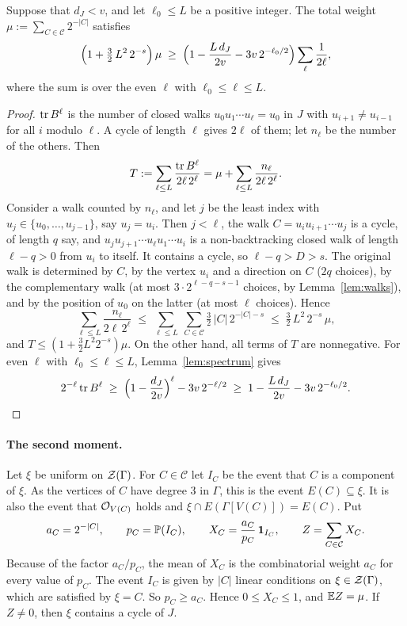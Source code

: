 \begin{lemma}\label{lem:weight}
Suppose that $d_J<v$, and let $\ell_0\le L$ be a positive integer. The total weight
$\mu:=\sum_{C\in\mathcal{C}}2^{-|C|}$ satisfies
\[
  \Bigl(1+\tfrac32\,L^{2}\,2^{-s}\Bigr)\,\mu\;\ge\;
  \Bigl(1-\frac{L\,d_J}{2v}-3v\,2^{-\ell_0/2}\Bigr)\sum_{\ell}\frac1{2\ell},
\]
where the sum is over the even $\ell$ with $\ell_0\le\ell\le L$.
\end{lemma}

\begin{proof}
$\operatorname{tr} B^{\ell}$ is the number of closed walks $u_0u_1\cdots u_\ell=u_0$ in $J$ with
$u_{i+1}\ne u_{i-1}$ for all $i$ modulo $\ell$. A cycle of length $\ell$ gives $2\ell$ of them; let
$n_\ell$ be the number of the others. Then
\[
  T:=\sum_{\ell\le L}\frac{\operatorname{tr} B^{\ell}}{2\ell\,2^{\ell}}=\mu+\sum_{\ell\le L}\frac{n_\ell}{2\ell\,2^{\ell}} .
\]
Consider a walk counted by $n_\ell$, and let $j$ be the least index with
$u_j\in\{u_0,\dots,u_{j-1}\}$, say $u_j=u_i$. Then $j<\ell$, the walk $C=u_iu_{i+1}\cdots u_j$ is a
cycle, of length $q$ say, and $u_ju_{j+1}\cdots u_\ell u_1\cdots u_i$ is a non-backtracking closed
walk of length $\ell-q>0$ from $u_i$ to itself. It contains a cycle, so $\ell-q>D>s$. The original
walk is determined by $C$, by the vertex $u_i$ and a direction on $C$ ($2q$ choices), by the
complementary walk (at most $3\cdot2^{\ell-q-s-1}$ choices, by Lemma~\ref{lem:walks}), and by the
position of $u_0$ on the latter (at most $\ell$ choices). Hence
\[
  \sum_{\ell\le L}\frac{n_\ell}{2\ell\,2^{\ell}}
  \;\le\;\sum_{\ell\le L}\ \sum_{C\in\mathcal{C}}\tfrac32\,|C|\,2^{-|C|-s}
  \;\le\;\tfrac32\,L^{2}\,2^{-s}\,\mu ,
\]
and $T\le(1+\frac32L^{2}2^{-s})\mu$. On the other hand, all terms of $T$ are nonnegative. For even
$\ell$ with $\ell_0\le\ell\le L$, Lemma~\ref{lem:spectrum} gives
\[
  2^{-\ell}\operatorname{tr} B^{\ell}\;\ge\;\Bigl(1-\frac{d_J}{2v}\Bigr)^{\ell}-3v\,2^{-\ell/2}
  \;\ge\;1-\frac{L\,d_J}{2v}-3v\,2^{-\ell_0/2}.\qedhere
\]
\end{proof}

\paragraph{The second moment.}
Let $\xi$ be uniform on $\mathcal{Z}(\Gamma)$. For $C\in\mathcal{C}$ let $I_C$ be the event that $C$ is a
component of $\xi$. As the vertices of $C$ have degree $3$ in $\Gamma$, this is the event
$E(C)\subseteq\xi$. It is also the event that $\mathcal{O}_{V(C)}$ holds and
$\xi\cap E(\Gamma[V(C)])=E(C)$. Put
\[
  a_C=2^{-|C|},\qquad p_C=\mathbb{P}(I_C),\qquad X_C=\frac{a_C}{p_C}\,\mathbf{1}_{I_C},\qquad
  Z=\sum_{C\in\mathcal{C}}X_C .
\]
Because of the factor $a_C/p_C$, the mean of $X_C$ is the combinatorial weight $a_C$ for every
value of $p_C$. The event $I_C$ is given by $|C|$ linear conditions on $\xi\in\mathcal{Z}(\Gamma)$,
which are satisfied by $\xi=C$. So $p_C\ge a_C$. Hence $0\le X_C\le1$, and $\mathbb{E} Z=\mu$. If
$Z\ne0$, then $\xi$ contains a cycle of $J$.

